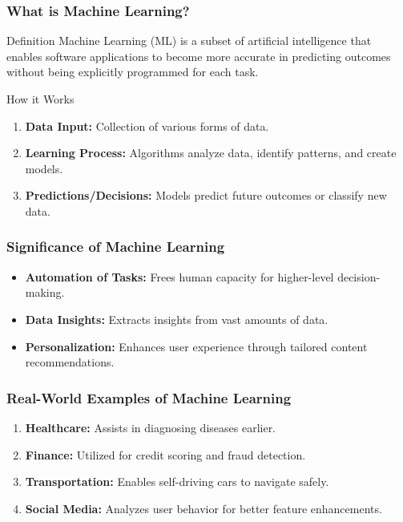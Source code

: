 \documentclass[aspectratio=169]{beamer}
\begin{document}
\frame{\titlepage}

\begin{frame}[fragile]
    \titlepage
\end{frame}

\begin{frame}[fragile]
    \frametitle{What is Machine Learning?}

    \begin{block}{Definition}
        Machine Learning (ML) is a subset of artificial intelligence that enables software applications to become more accurate in predicting outcomes without being explicitly programmed for each task.
    \end{block}
    
    \begin{block}{How it Works}
        \begin{enumerate}
            \item \textbf{Data Input:} Collection of various forms of data.
            \item \textbf{Learning Process:} Algorithms analyze data, identify patterns, and create models.
            \item \textbf{Predictions/Decisions:} Models predict future outcomes or classify new data.
        \end{enumerate}
    \end{block}
\end{frame}

\begin{frame}[fragile]
    \frametitle{Significance of Machine Learning}

    \begin{itemize}
        \item \textbf{Automation of Tasks:} Frees human capacity for higher-level decision-making.
        \item \textbf{Data Insights:} Extracts insights from vast amounts of data.
        \item \textbf{Personalization:} Enhances user experience through tailored content recommendations.
    \end{itemize}
\end{frame}

\begin{frame}[fragile]
    \frametitle{Real-World Examples of Machine Learning}

    \begin{enumerate}
        \item \textbf{Healthcare:} Assists in diagnosing diseases earlier.
        \item \textbf{Finance:} Utilized for credit scoring and fraud detection.
        \item \textbf{Transportation:} Enables self-driving cars to navigate safely.
        \item \textbf{Social Media:} Analyzes user behavior for better feature enhancements.
    \end{enumerate}
\end{frame}
\end{document}
